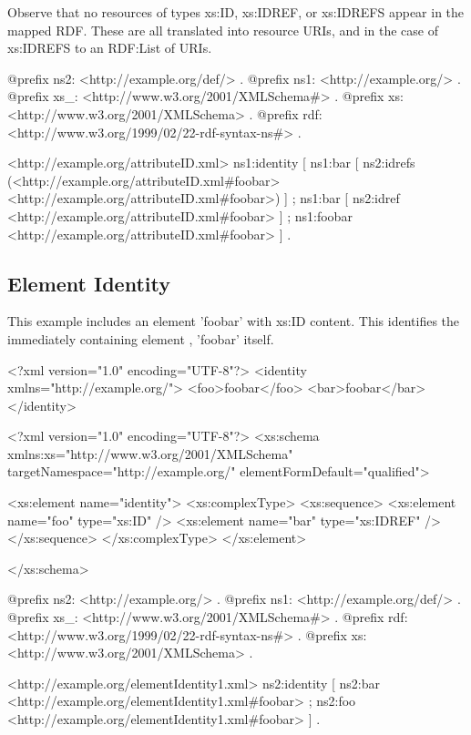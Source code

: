 Observe that no resources of types xs:ID, xs:IDREF, or xs:IDREFS appear in the mapped RDF. These are all translated into resource URIs, and in the case of xs:IDREFS to an RDF:List of URIs.


\begin{DoxyCodeInclude}
@prefix ns2:     <http://example.org/def/> .
@prefix ns1:     <http://example.org/> .
@prefix xs_:     <http://www.w3.org/2001/XMLSchema#> .
@prefix xs:      <http://www.w3.org/2001/XMLSchema> .
@prefix rdf:     <http://www.w3.org/1999/02/22-rdf-syntax-ns#> .

<http://example.org/attributeID.xml>
      ns1:identity
              [ ns1:bar [ ns2:idrefs (<http://example.org/attributeID.xml#foobar>
       <http://example.org/attributeID.xml#foobar>)
                        ] ;
                ns1:bar [ ns2:idref <http://example.org/attributeID.xml#foobar>
                        ] ;
                ns1:foobar <http://example.org/attributeID.xml#foobar>
              ] .
\end{DoxyCodeInclude}
 \hypertarget{elementID}{}\subsection{Element Identity}\label{elementID}
This example includes an element 'foobar' with xs:ID content. This identifies the immediately containing element , 'foobar' itself.


\begin{DoxyCodeInclude}
<?xml version="1.0" encoding="UTF-8"?>
<identity xmlns="http://example.org/">
        <foo>foobar</foo>
        <bar>foobar</bar>
</identity>
\end{DoxyCodeInclude}
 
\begin{DoxyCodeInclude}
<?xml version="1.0" encoding="UTF-8"?>
<xs:schema xmlns:xs="http://www.w3.org/2001/XMLSchema" 
        targetNamespace="http://example.org/" elementFormDefault="qualified">
        
        <xs:element name="identity">
                <xs:complexType>
                        <xs:sequence>
                                <xs:element name="foo" type="xs:ID" />
                                <xs:element name="bar" type="xs:IDREF" />
                        </xs:sequence>
                </xs:complexType>
        </xs:element>

</xs:schema>
\end{DoxyCodeInclude}
 
\begin{DoxyCodeInclude}
@prefix ns2:     <http://example.org/> .
@prefix ns1:     <http://example.org/def/> .
@prefix xs_:     <http://www.w3.org/2001/XMLSchema#> .
@prefix rdf:     <http://www.w3.org/1999/02/22-rdf-syntax-ns#> .
@prefix xs:      <http://www.w3.org/2001/XMLSchema> .

<http://example.org/elementIdentity1.xml>
      ns2:identity
              [ ns2:bar <http://example.org/elementIdentity1.xml#foobar> ;
                ns2:foo <http://example.org/elementIdentity1.xml#foobar>
              ] .
\end{DoxyCodeInclude}
 